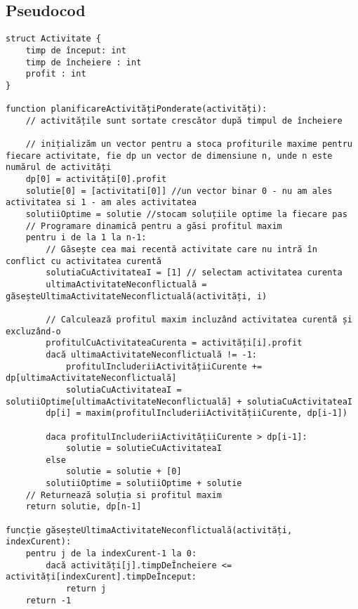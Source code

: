 \subsection{Pseudocod}
\begin{verbatim}
struct Activitate {
    timp de început: int
    timp de încheiere : int
    profit : int 
}

function planificareActivitățiPonderate(activități):
    // activitățile sunt sortate crescător după timpul de încheiere
    
    // inițializăm un vector pentru a stoca profiturile maxime pentru fiecare activitate, fie dp un vector de dimensiune n, unde n este numărul de activități
    dp[0] = activități[0].profit
    solutie[0] = [activitati[0]] //un vector binar 0 - nu am ales activitatea si 1 - am ales activitatea
    solutiiOptime = solutie //stocam soluțiile optime la fiecare pas
    // Programare dinamică pentru a găsi profitul maxim
    pentru i de la 1 la n-1:
        // Găsește cea mai recentă activitate care nu intră în conflict cu activitatea curentă
        solutiaCuActivitateaI = [1] // selectam activitatea curenta
        ultimaActivitateNeconflictuală = găseșteUltimaActivitateNeconflictuală(activități, i)
        
        // Calculează profitul maxim incluzând activitatea curentă și excluzând-o
        profitulCuActivitateaCurenta = activități[i].profit
        dacă ultimaActivitateNeconflictuală != -1:
            profitulIncluderiiActivitățiiCurente += dp[ultimaActivitateNeconflictuală]
            solutiaCuActivitateaI = solutiiOptime[ultimaActivitateNeconflictuală] + solutiaCuActivitateaI
        dp[i] = maxim(profitulIncluderiiActivitățiiCurente, dp[i-1])
        
        daca profitulIncluderiiActivitățiiCurente > dp[i-1]:
            solutie = solutieCuActivitateaI
        else
            solutie = solutie + [0]
        solutiiOptime = solutiiOptime + solutie 
    // Returnează soluția si profitul maxim
    return solutie, dp[n-1]

funcție găseșteUltimaActivitateNeconflictuală(activități, indexCurent):
    pentru j de la indexCurent-1 la 0:
        dacă activități[j].timpDeÎncheiere <= activități[indexCurent].timpDeÎnceput:
            return j
    return -1



\end{verbatim}

